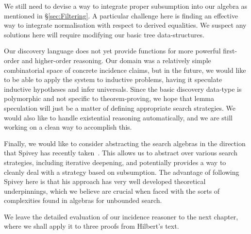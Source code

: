 We still need to devise a way to integrate proper subsumption into our algebra as mentioned in \S\ref{sec:Filtering}. A particular challenge here is finding an effective way to integrate normalisation with respect to derived equalities. We suspect any solutions here will require modifying our basic tree data-structures. 

Our discovery language does not yet provide functions for more powerful first-order and higher-order reasoning. Our domain was a relatively simple combinatorial space of concrete incidence claims, but in the future, we would like to be able to apply the system to inductive problems, having it speculate inductive hypotheses and infer universals. Since the basic discovery data-type is polymorphic and not specific to theorem-proving, we hope that lemma speculation will just be a matter of defining appropriate search strategies. We would also like to handle existential reasoning automatically, and we are still working on a clean way to accomplish this. 

Finally, we would like to consider abstracting the search algebras in the direction that Spivey has recently taken~\cite{SearchAlgebras}. This allows us to abstract over various search strategies, including iterative deepening, and potentially provides a way to cleanly deal with a strategy based on subsumption. The advantage of following Spivey here is that his approach has very well developed theoretical underpinnings, which we believe are crucial when faced with the sorts of complexities found in algebras for unbounded search.

We leave the detailed evaluation of our incidence reasoner to the next chapter, where we shall apply it to three proofs from Hilbert's text.
